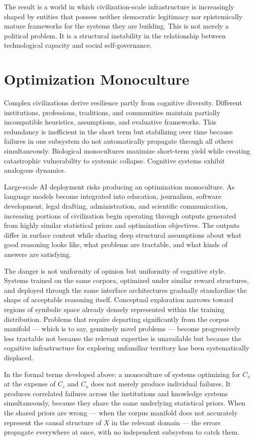 \documentclass[12pt, a4paper]{article}
\theoremstyle{remark}
\begin{document}
The result is a world in which civilization-scale infrastructure is increasingly shaped by entities that possess neither democratic legitimacy nor epistemically mature frameworks for the systems they are building. This is not merely a political problem. It is a structural instability in the relationship between technological capacity and social self-governance.

\section{Optimization Monoculture}

Complex civilizations derive resilience partly from cognitive diversity. Different institutions, professions, traditions, and communities maintain partially incompatible heuristics, assumptions, and evaluative frameworks. This redundancy is inefficient in the short term but stabilizing over time because failures in one subsystem do not automatically propagate through all others simultaneously. Biological monocultures maximize short-term yield while creating catastrophic vulnerability to systemic collapse. Cognitive systems exhibit analogous dynamics.

Large-scale AI deployment risks producing an optimization monoculture. As language models become integrated into education, journalism, software development, legal drafting, administration, and scientific communication, increasing portions of civilization begin operating through outputs generated from highly similar statistical priors and optimization objectives. The outputs differ in surface content while sharing deep structural assumptions about what good reasoning looks like, what problems are tractable, and what kinds of answers are satisfying.

The danger is not uniformity of opinion but uniformity of cognitive style. Systems trained on the same corpora, optimized under similar reward structures, and deployed through the same interface architectures gradually standardize the shape of acceptable reasoning itself. Conceptual exploration narrows toward regions of symbolic space already densely represented within the training distribution. Problems that require departing significantly from the corpus manifold --- which is to say, genuinely novel problems --- become progressively less tractable not because the relevant expertise is unavailable but because the cognitive infrastructure for exploring unfamiliar territory has been systematically displaced.

In the formal terms developed above: a monoculture of systems optimizing for $C_s$ at the expense of $C_c$ and $C_o$ does not merely produce individual failures. It produces correlated failures across the institutions and knowledge systems simultaneously, because they share the same underlying statistical priors. When the shared priors are wrong --- when the corpus manifold does not accurately represent the causal structure of $X$ in the relevant domain --- the errors propagate everywhere at once, with no independent subsystem to catch them.
\end{document}
